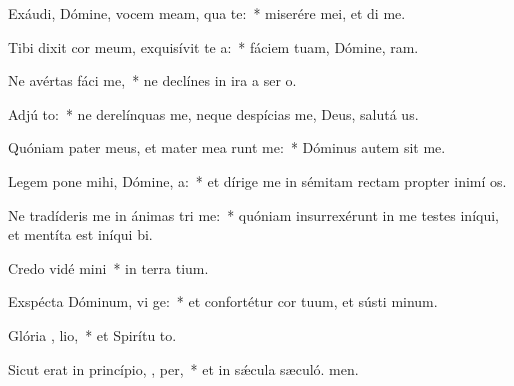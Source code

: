 \item Exáudi, Dómine, vocem meam, qua   te:~* miserére mei, et di me.
\item Tibi dixit cor meum, exquisívit te  a:~* fáciem tuam, Dómine, ram.
\item Ne avértas fáci   me,~* ne declínes in ira a ser o.
\item Adjú  to:~* ne derelínquas me, neque despícias me, Deus, salutá us.
\item Quóniam pater meus, et mater mea runt me:~* Dóminus autem sit me.
\item Legem pone mihi, Dómine,   a:~* et dírige me in sémitam rectam propter inimí os.
\item Ne tradíderis me in ánimas tri me:~* quóniam insurrexérunt in me testes iníqui, et mentíta est iníqui bi.
\item Credo vidé  mini~* in terra tium.
\item Exspécta Dóminum, vi ge:~* et confortétur cor tuum, et sústi minum.
\item Glória ,  lio,~* et Spirítu to.
\item Sicut erat in princípio,  ,  per,~* et in sǽcula sæculó. men.
